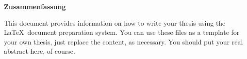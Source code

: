 \begin{center}
\textbf{\large Zusammenfassung}
\end{center}

This document provides information on how to write your thesis using
the \LaTeX\ document preparation system.  You can use these files as a
template for your own thesis, just replace the content, as necessary.
You should put your real abstract here, of course.


\vspace{1cm}
